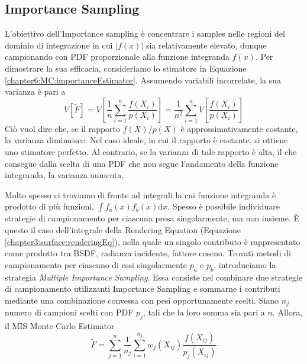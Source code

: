 \subsection{Importance Sampling}\label{chapter6:variance:importanceSampling}
L'obiettivo dell'Importance sampling \`e concentrare i samples nelle regioni del dominio di integrazione in cui $|f(x)|$ sia relativamente elevato, 
dunque campionando con PDF proporzionale alla funzione integranda $f(x)$. Per dimostrare la sua efficacia, consideriamo lo stimatore in 
Equazione \ref{chapter6:MC:importanceEstimator}. Assumendo variabili incorrelate, la sua varianza \`e pari a
\begin{equation}
	V[\tilde{F}]=V\left[\frac{1}{n}\sum_{i=1}^n\frac{f(X_i)}{p(X_i)}\right]=\frac{1}{n^2}\sum_{i=1}^nV\left[\frac{f(X_i)}{p(X_i)}\right]
\end{equation}
Ci\`o vuol dire che, se il rapporto $f(X)/p(X)$ \`e approssimativamente costante, la varianza diminuisce. Nel caso ideale, in cui il rapporto \`e 
costante, si ottiene uno stimatore perfetto. Al contrario, se la varianza di tale rapporto \`e alta, il che consegue dalla scelta di una PDF che 
non segue l'andamento della funzione integranda, la varianza aumenta.\par
Molto spesso ci troviamo di fronte ad integrali la cui funzione integranda \`e prodotto di pi\`u funzioni, $\int f_a(x)f_b(x)\mathrm{d}x$. Spesso
\`e possibile individuare strategie di campionamento per ciascuna presa singolarmente, ma non insieme. \`E questo il caso dell'integrale della 
Rendering Equation (Equazione \ref{chapter3:surface:renderingEq}), nella quale un singolo contributo \`e rappresentato come prodotto tra BSDF, 
radianza incidente, fattore coseno. Trovati metodi di campionamento per ciascuno di essi singolarmente $p_a$ e $p_b$, introduciamo la strategia
\textit{Multiple Importance Sampling}. Essa consiste nel combinare due strategie di campionamento utilizzanti Importance Sampling e sommarne i 
contributi mediante una combinazione convessa con pesi opportunamente scelti. Siano $n_j$ numero di campioni scelti con PDF $p_j$, tali che la loro
somma sia pari a $n$. Allora, il MIS Monte Carlo Estimator
\begin{equation}\label{chapter6:variance:MISMC}
	\tilde{F}=\sum_{j=1}^n\frac{1}{n_j}\sum_{i=1}^{n_j}w_j(X_{ij})\frac{f(X_{ij})}{p_j(X_{ij})}
\end{equation}
